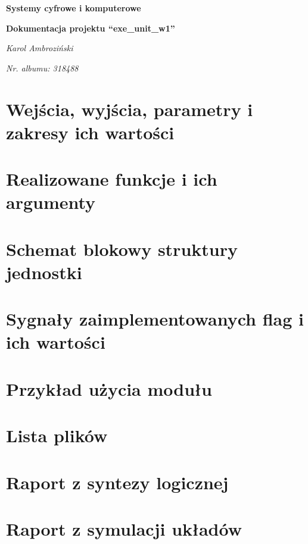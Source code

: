 \documentclass[12pt]{article}
\title{}
\author{}
\date{}
\begin{document}
	\begin{titlepage}
		\centering
		\vspace{1cm}
		{\huge\bfseries Systemy cyfrowe i komputerowe\par}
		\vspace{0.5cm}
		{\huge\bfseries Dokumentacja projektu ``exe\_unit\_w1''\par}
		\vspace{2cm}
		{\Large\itshape Karol Ambroziński\par}
		\vspace{0cm}
		{\Large\itshape Nr. albumu: 318488\par}
		\vfill
	\end{titlepage}

	\tableofcontents
	
	\newpage
	
	\section{Wejścia, wyjścia, parametry i zakresy ich wartości}
	
	
	
	\section{Realizowane funkcje i ich argumenty}

	
	
	\section{Schemat blokowy struktury jednostki}
	\blindtext
	\section{Sygnały zaimplementowanych flag i ich wartości}
	
	

	\section{Przykład użycia modułu}
	\blindtext
	\section{Lista plików}
	\blindtext
	\section{Raport z syntezy logicznej}
	\blindtext
	\section{Raport z symulacji układów}
	\blindtext
	
\end{document}
